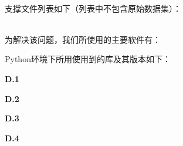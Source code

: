 \documentclass{MathorCupmodeling}
\begin{document}

\newpage
	~\\

	支撑文件列表如下（列表中不包含原始数据集）：

\newpage
	~\\

	为解决该问题，我们所使用的主要软件有：
	
	Python环境下所用使用到的库及其版本如下：

\newpage

\textbf{D.1 }

\newpage
\textbf{D.2 }

\newpage
\textbf{D.3 }

\newpage
\textbf{D.4 }
\end{document}

